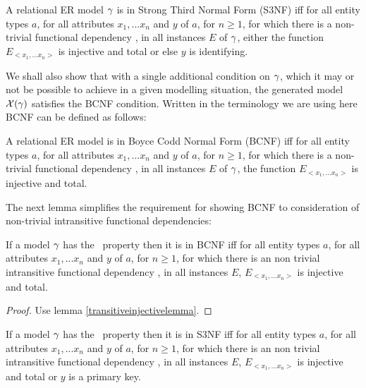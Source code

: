 \begin{definition} %
A relational ER model $\gamma$ is in Strong Third Normal Form (S3NF)  iff
for all entity types $a$, for all attributes $x_1,...x_n$ and $y$ of $a$, for $n \geq 1$, 
for which  there is a non-trivial functional dependency , 
in all instances $E$  of $\gamma$, either the function $E_{<x_1,...x_n>}$ is injective and total
or else $y$ is identifying.
\end{definition}

We shall also show that with a single additional condition on $\gamma$, which it may or not be possible to achieve in a given modelling situation,
the generated model $\mathcal{X}(\gamma)$ satisfies the BCNF condition.
Written in the terminology we are using here BCNF can be defined as follows:
\begin{definition} %
A relational ER model is in Boyce Codd Normal Form (BCNF)  iff
for all entity types $a$, for all attributes $x_1,...x_n$ and $y$ of $a$, for $n \geq 1$, 
for which  there is a non-trivial functional dependency , 
in all instances $E$  of $\gamma$, the function $E_{<x_1,...x_n>}$ is injective and total.  
\end{definition}

\noindent The next lemma simplifies the requirement for showing BCNF to consideration of non-trivial
intransitive functional dependencies:
\begin{lemma}
\label{BCNFsublemma}
If a model $\gamma$ has the \fdfactoring\ property then it is in BCNF iff
for all entity types $a$, for all attributes $x_1,...x_n$ and $y$ of $a$, for $n \geq 1$, 
for which there is an non trivial  intransitive functional dependency ,
in all instances $E$, $E_{<x_1,...x_n>}$ is injective and total. 
\end{lemma}
\begin{proof}Use lemma \ref{transitiveinjectivelemma}.
\end{proof}
\begin{lemma}
\label{S3NFsublemma}
If a model $\gamma$ has the \fdfactoring\ property then it is in S3NF iff
for all entity types $a$, for all attributes $x_1,...x_n$ and $y$ of $a$, for $n \geq 1$, 
for which there is an non trivial intransitive functional dependency ,
in all instances $E$, $E_{<x_1,...x_n>}$ is injective and total or $y$ is a primary key. 
\end{lemma}
